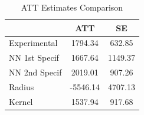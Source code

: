 \begin{table}[htbp]\centering
\caption{ATT Estimates Comparison}
\begin{tabular}{l*{2}{c}}
\hline\hline
            &         ATT&          SE\\
\hline
Experimental&     1794.34&      632.85\\
NN 1st Specif&     1667.64&     1149.37\\
NN 2nd Specif&     2019.01&      907.26\\
Radius      &    -5546.14&     4707.13\\
Kernel      &     1537.94&      917.68\\
\hline\hline
\end{tabular}
\end{table}
